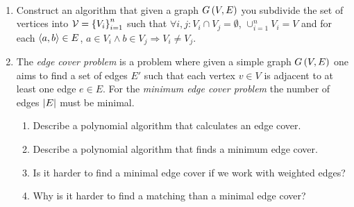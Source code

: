 \documentclass{article}
\begin{document}
\begin{exercise}~~
\begin{enumerate}
 \item Construct an algorithm that given a graph $G\left( V,E \right)$ you subdivide the set of vertices into $\mathcal{V}=\left\{ V_i \right\}_{i=1}^n$ such that $\forall i,j:V_i\cap V_j=\emptyset$, $\cup_{i=1}^nV_i=V$ and for each $\left\langle a,b \right\rangle\in E$, $a\in V_i\wedge b\in V_j\Rightarrow V_i\neq V_j$.
 \item The \emph{edge cover problem} is a problem where given a simple graph $G\left( V,E \right)$ one aims to find a set of edges $E'$ such that each vertex $v\in V$ is adjacent to at least one edge $e\in E$. For the \emph{minimum edge cover problem} the number of edges $\left|E\right|$ must be minimal.
 \begin{enumerate}
  \item Describe a polynomial algorithm that calculates an edge cover.
  \item Describe a polynomial algorithm that finds a minimum edge cover.
  \item Is it harder to find a minimal edge cover if we work with weighted edges?
  \item Why is it harder to find a matching than a minimal edge cover?
 \end{enumerate}
\end{enumerate}
\end{exercise}
\end{document}
